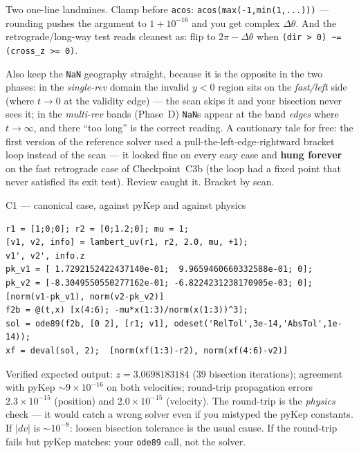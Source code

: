 \documentclass[11pt,letterpaper]{article}
\newcommand{\dth}{\Delta\theta}
\begin{document}
\begin{hint}
Two one-line landmines. Clamp before \texttt{acos}:
\texttt{acos(max(-1,min(1,...)))} --- rounding pushes the argument to
$1 + 10^{-16}$ and you get complex $\dth$. And the retrograde/long-way
test reads cleanest as: flip to $2\pi - \dth$ when
\texttt{(dir > 0) \~{}= (cross\_z >= 0)}.

Also keep the \texttt{NaN} geography straight, because it is the opposite
in the two phases: in the \emph{single-rev} domain the invalid $y<0$
region sits on the \emph{fast/left} side (where $t \to 0$ at the validity
edge) --- the scan skips it and your bisection never sees it; in the
\emph{multi-rev} bands (Phase~D) \texttt{NaN}s appear at the band
\emph{edges} where $t \to \infty$, and there ``too long'' is the correct
reading. A cautionary tale for free: the first version of the
reference solver used a pull-the-left-edge-rightward bracket loop instead
of the scan --- it looked fine on every easy case and \textbf{hung
forever} on the fast retrograde case of Checkpoint~C3b (the loop had a
fixed point that never satisfied its exit test). Review caught it.
Bracket by scan.
\end{hint}

\begin{checkpoint}{C1 --- canonical case, against pyKep and against physics}
\begin{verbatim}
r1 = [1;0;0]; r2 = [0;1.2;0]; mu = 1;
[v1, v2, info] = lambert_uv(r1, r2, 2.0, mu, +1);
v1', v2', info.z
pk_v1 = [ 1.7292152422437140e-01;  9.9659460660332588e-01; 0];
pk_v2 = [-8.3049550550277162e-01; -6.8224231238170905e-03; 0];
[norm(v1-pk_v1), norm(v2-pk_v2)]
f2b = @(t,x) [x(4:6); -mu*x(1:3)/norm(x(1:3))^3];
sol = ode89(f2b, [0 2], [r1; v1], odeset('RelTol',3e-14,'AbsTol',1e-14));
xf = deval(sol, 2);  [norm(xf(1:3)-r2), norm(xf(4:6)-v2)]
\end{verbatim}
Verified expected output: $z = 3.0698183184$ (39 bisection iterations);
agreement with pyKep $\sim$$9\times10^{-16}$ on both velocities;
round-trip propagation errors $2.3\times10^{-15}$ (position) and
$2.0\times10^{-15}$ (velocity). The round-trip is the \emph{physics} check --- it would catch
a wrong solver even if you mistyped the pyKep constants. If $|dv|$ is
$\sim$$10^{-8}$: loosen bisection tolerance is the usual cause. If the
round-trip fails but pyKep matches: your \texttt{ode89} call, not the solver.
\end{checkpoint}
\end{document}

